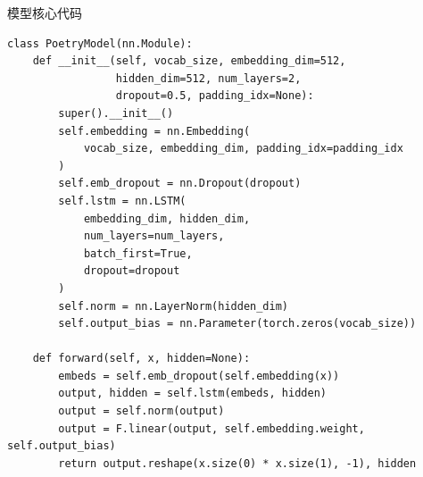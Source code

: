 \documentclass[aspectratio=169,10pt]{ctexbeamer}
\begin{document}
\begin{frame}[fragile]{模型核心代码}
\begin{lstlisting}
class PoetryModel(nn.Module):
    def __init__(self, vocab_size, embedding_dim=512,
                 hidden_dim=512, num_layers=2,
                 dropout=0.5, padding_idx=None):
        super().__init__()
        self.embedding = nn.Embedding(
            vocab_size, embedding_dim, padding_idx=padding_idx
        )
        self.emb_dropout = nn.Dropout(dropout)
        self.lstm = nn.LSTM(
            embedding_dim, hidden_dim,
            num_layers=num_layers,
            batch_first=True,
            dropout=dropout
        )
        self.norm = nn.LayerNorm(hidden_dim)
        self.output_bias = nn.Parameter(torch.zeros(vocab_size))

    def forward(self, x, hidden=None):
        embeds = self.emb_dropout(self.embedding(x))
        output, hidden = self.lstm(embeds, hidden)
        output = self.norm(output)
        output = F.linear(output, self.embedding.weight, self.output_bias)
        return output.reshape(x.size(0) * x.size(1), -1), hidden
\end{lstlisting}
\end{frame}
\end{document}
